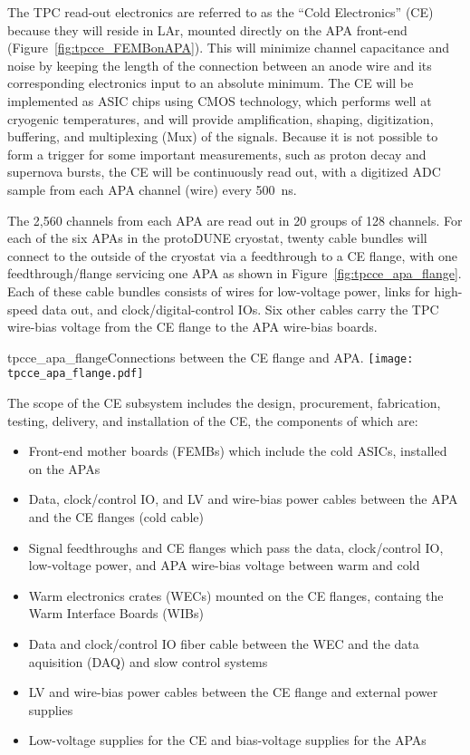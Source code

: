 The TPC read-out electronics are referred to as the ``Cold Electronics'' (CE) because they will reside in LAr,
mounted directly on the APA front-end (Figure~\ref{fig:tpcce_FEMBonAPA}).
This will minimize channel capacitance and noise by keeping the length of the connection between an anode wire
and its corresponding electronics input to an absolute minimum.
The CE will be implemented as ASIC chips using CMOS technology,
which performs well at cryogenic temperatures,
and will provide amplification, shaping, digitization, buffering, and multiplexing (Mux) of the signals.
Because it is not possible to form a trigger for some important measurements,
such as proton decay and supernova bursts, the CE will be continuously read out,
with a digitized ADC sample from each APA channel (wire) every 500~ns.

The 2,560 channels from each APA are read out in 20 groups of 128 channels.
For each of the six APAs in the protoDUNE cryostat, twenty cable bundles will 
connect to the outside of the cryostat via a feedthrough to a CE flange, with one 
feedthrough/flange servicing one APA as shown in Figure~\ref{fig:tpcce_apa_flange}. 
Each of these cable bundles consists of wires for low-voltage power, links for high-speed 
data out, and clock/digital-control IOs. Six other cables carry the TPC wire-bias voltage 
from the CE flange to the APA wire-bias boards.

\begin{cdrfigure}{tpcce_apa_flange}{Connections between
the CE flange and APA.}
\texttt{[image: tpcce\_apa\_flange.pdf]}
\end{cdrfigure}

The scope of the CE subsystem includes the design, procurement, fabrication, testing,
delivery, and installation of the CE, the components of which are:
\begin{itemize}
\item Front-end mother boards (FEMBs) which include the cold ASICs, installed on the APAs
\item Data, clock/control IO, and LV and wire-bias power cables 
between the APA and the CE flanges (cold cable)
\item Signal feedthroughs and CE flanges which pass the data, clock/control IO, 
low-voltage power, and APA wire-bias voltage between warm and cold
\item Warm electronics crates (WECs) mounted on the CE flanges, containg the Warm Interface Boards (WIBs)
\item Data and clock/control IO fiber cable between the WEC and the data aquisition 
(DAQ) and slow control systems
\item LV and wire-bias power cables between the CE flange and external power supplies
\item Low-voltage supplies for the CE and bias-voltage supplies for the APAs
\end{itemize}

